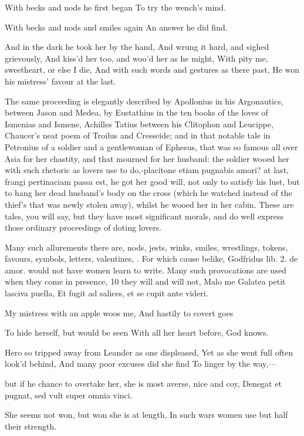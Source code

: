 {With becks and nods he first began
To try the wench's mind.

With becks and nods and smiles again
An answer he did find.

And in the dark he took her by the hand,
And wrung it hard, and sighed grievously,
And kiss'd her too, and woo'd her as he might,
With pity me, sweetheart, or else I die,
And with such words and gestures as there past,
He won his mistress' favour at the last.

The same proceeding is elegantly described by Apollonius in his
Argonautics, between Jason and Medea, by Eustathius in the ten books of
the loves of Ismenias and Ismene, Achilles Tatius between his Clitophon
and Leucippe, Chaucer's neat poem of Troilus and Cresseide; and in that
notable tale in Petronius of a soldier and a gentlewoman of Ephesus,
that was so famous all over Asia for her chastity, and that mourned for
her husband: the soldier wooed her with such rhetoric as lovers use to
do,-placitone etiam pugnabis amori? \etc{} at last, frangi pertinaciam
passa est, he got her good will, not only to satisfy his lust,
but to hang her dead husband's body on the cross (which he
watched instead of the thief's that was newly stolen away), whilst he
wooed her in her cabin. These are tales, you will say, but they have
most significant morals, and do well express those ordinary proceedings
of doting lovers.

Many such allurements there are, nods, jests, winks, smiles,
wrestlings, tokens, favours, symbols, letters, valentines, \etc{}. For
which cause belike, Godfridus lib. 2. de amor. would not have women
learn to write. Many such provocations are used when they come in
presence, 10 they will and will not,
Malo me Galatea petit lasciva puella,
Et fugit ad salices, et se cupit ante videri.


My mistress with an apple woos me,
And hastily to covert goes

To hide herself, but would be seen
With all her heart before, God knows.

Hero so tripped away from Leander as one displeased,
Yet as she went full often look'd behind,
And many poor excuses did she find
To linger by the way,---

but if he chance to overtake her, she is most averse, nice and coy,
Denegat et pugnat, sed vult super omnia vinci.

She seems not won, but won she is at length,
In such wars women use but half their strength.

}
